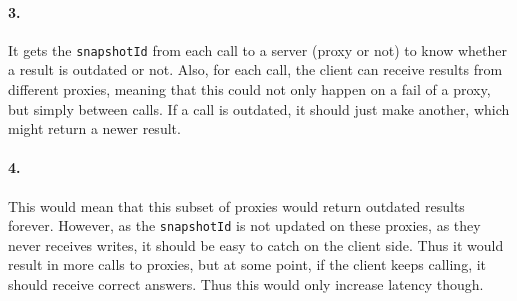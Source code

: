 \documentclass[a4paper, 11pt]{article}
\begin{document}
\paragraph{3.}
It gets the \texttt{snapshotId} from each call to a server (proxy or not) to know whether a result is outdated or not. Also, for each call, the client can receive results from different proxies, meaning that this could not only happen on a fail of a proxy, but simply between calls. If a call is outdated, it should just make another, which might return a newer result. 

\paragraph{4.}
This would mean that this subset of proxies would return outdated results forever. However, as the \texttt{snapshotId} is not updated on these proxies, as they never receives writes, it should be easy to catch on the client side. Thus it would result in more calls to proxies, but at some point, if the client keeps calling, it should receive correct answers. Thus this would only increase latency though.

\end{document}
